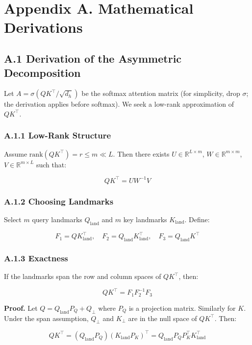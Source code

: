 
\section{Appendix A. Mathematical Derivations}

\subsection{A.1 Derivation of the Asymmetric Decomposition}

Let $A = \sigma(Q K^\top / \sqrt{d_h})$ be the softmax attention matrix (for 
simplicity, drop $\sigma$; the derivation applies before softmax). We seek 
a low-rank approximation of $QK^\top$.

\subsubsection{A.1.1 Low-Rank Structure}

Assume $\text{rank}(QK^\top) = r \le m \ll L$. Then there exists 
$U \in \mathbb{R}^{L \times m}$, $W \in \mathbb{R}^{m \times m}$, 
$V \in \mathbb{R}^{m \times L}$ such that:

\[
QK^\top = U W^{-1} V
\]

\subsubsection{A.1.2 Choosing Landmarks}

Select $m$ query landmarks $Q_\text{land}$ and $m$ key landmarks $K_\text{land}$. 
Define:

\[
F_1 = Q K_\text{land}^\top, \quad
F_2 = Q_\text{land} K_\text{land}^\top, \quad
F_3 = Q_\text{land} K^\top
\]

\subsubsection{A.1.3 Exactness}

If the landmarks span the row and column spaces of $QK^\top$, then:

\[
Q K^\top = F_1 F_2^{-1} F_3
\]

\textbf{Proof.} Let $Q = Q_\text{land} P_Q + Q_\perp$ where $P_Q$ is a 
projection matrix. Similarly for $K$. Under the span assumption, 
$Q_\perp$ and $K_\perp$ are in the null space of $QK^\top$. Then:

\[
QK^\top = (Q_\text{land} P_Q)(K_\text{land} P_K)^\top = Q_\text{land} P_Q P_K^\top K_\text{land}^\top
\]

